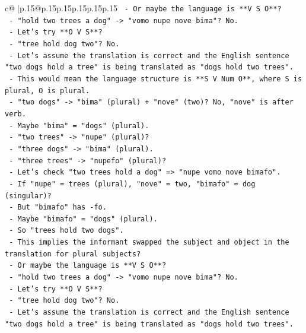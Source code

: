 \documentclass{article}
\begin{document}
{\begin{supertabular}{c@{$\;$}|p{.15\linewidth}@{}p{.15\linewidth}p{.15\linewidth}p{.15\linewidth}p{.15\linewidth}p{.15\linewidth}}
{{{\texttt{             {-} Or maybe the language is **V S O**?} \\
\texttt{             {-} "hold two trees a dog" {-}> "vomo nupe nove bima"? No.} \\
\texttt{             {-} Let's try **O V S**?} \\
\texttt{             {-} "tree hold dog two"? No.} \\
\texttt{             {-} Let's assume the translation is correct and the English sentence "two dogs hold a tree" is being translated as "dogs hold two trees".} \\
\texttt{             {-} This would mean the language structure is **S V Num O**, where S is plural, O is plural.} \\
\texttt{             {-} "two dogs" {-}> "bima" (plural) + "nove" (two)? No, "nove" is after verb.} \\
\texttt{             {-} Maybe "bima" = "dogs" (plural).} \\
\texttt{             {-} "two trees" {-}> "nupe" (plural)?} \\
\texttt{             {-} "three dogs" {-}> "bima" (plural).} \\
\texttt{             {-} "three trees" {-}> "nupefo" (plural)?} \\
\texttt{             {-} Let's check "two trees hold a dog" => "nupe vomo nove bimafo".} \\
\texttt{             {-} If "nupe" = trees (plural), "nove" = two, "bimafo" = dog (singular)?} \\
\texttt{             {-} But "bimafo" has {-}fo.} \\
\texttt{             {-} Maybe "bimafo" = "dogs" (plural).} \\
\texttt{             {-} So "trees hold two dogs".} \\
\texttt{             {-} This implies the informant swapped the subject and object in the translation for plural subjects?} \\
\texttt{             {-} Or maybe the language is **V S O**?} \\
\texttt{             {-} "hold two trees a dog" {-}> "vomo nupe nove bima"? No.} \\
\texttt{             {-} Let's try **O V S**?} \\
\texttt{             {-} "tree hold dog two"? No.} \\
\texttt{             {-} Let's assume the translation is correct and the English sentence "two dogs hold a tree" is being translated as "dogs hold two trees".} \\
}}}
\end{supertabular}}
\end{document}
